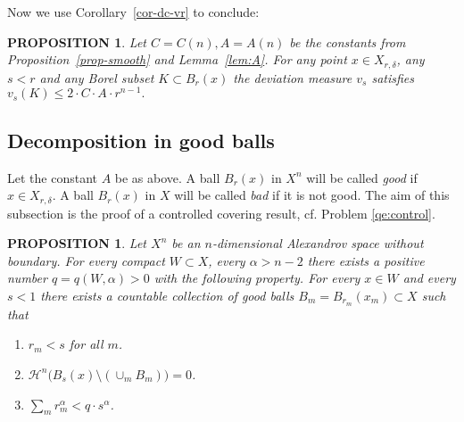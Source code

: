 \documentclass[12pt,leqno]{amsart}
\numberwithin{equation}{section}
\newtheorem{prop}[thm]{PROPOSITION}
\theoremstyle{definition}
\theoremstyle{remark}
\newcommand{\cref}[1]{Corollary~\ref{#1}}
\newcommand{\pref}[1]{Proposition~\ref{#1}}
\newcommand{\lref}[1]{Lemma~\ref{#1}}
\def\RR{\mathbb R}
\def\eps{\varepsilon}
\begin{document}

Now we use \cref{cor-dc-vr} to conclude:


 \begin{prop}  \label{ballmeasure}
Let $C=C(n),A=A(n)$ be the constants from \pref{prop-smooth} and \lref{lem:A}.
For any point $x\in X_{r,\delta}$, any $s<r$ and any
 Borel subset $K\subset B_r (x)$ the deviation measure $v_s $ satisfies
  $v_s (K)  \leq 2\cdot C\cdot A \cdot r^{n-1}.$
 \end{prop}





\subsection{Decomposition in good balls}
Let the constant  $A$ be as above.
A ball $B_r(x)$ in $X^n$ will be called \emph{good} if $x\in X_{r,\delta}$.
%
A ball $B_r(x)$ in $X$ will be called \emph{bad} if it is not good.
The aim of this subsection is the proof of a controlled covering result, cf. Problem \ref{qe:control}.




\begin{prop}\label{prop:covering}
Let $X^n$ be an $n$-dimensional Alexandrov space without boundary.  For every compact $W\subset X$, every $\alpha >n-2$   there exists
a positive number $  q =q(W,\alpha )  >0$ with the following property. For every $x\in W$ and every $s<1 $
 there exists a countable collection of good balls $B_m=B_{r_m}(x_m) \subset X$
such that
\begin{enumerate}
\item $r_m<s$ for all $m$.
\item $ \mathcal H^n \big(B_s (x) \setminus   (\cup _m B_m )\big)=0$.
\item  $\sum_m r_m^{\alpha}< q \cdot s^{\alpha}$.
\end{enumerate}
\end{prop}
\end{document}
